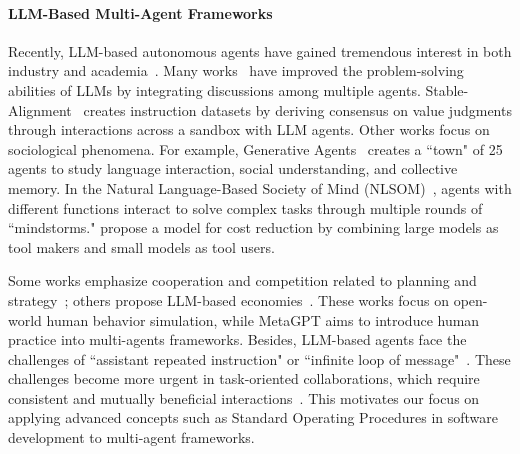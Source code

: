 \paragraph{LLM-Based Multi-Agent Frameworks} 
%
Recently, LLM-based autonomous agents have gained tremendous interest in both industry and academia~\citep{wang2023survey,zhou2023agents,zhang2023igniting}.
Many works~\citep{chen2024s,wang2023unleashing,du2023improving,zhuge2023mindstorms,hao2023chatllm,akata2023playing,tang2023medagents} have improved the problem-solving abilities of LLMs by integrating discussions among multiple agents.
%
Stable-Alignment~\citep{liu2023training} creates instruction datasets by deriving consensus on value judgments through interactions across a sandbox with LLM agents.
%
Other works focus on sociological phenomena. For example, Generative Agents~\citep{park2023generative} creates a ``town" of 25 agents to study language interaction, social understanding, and collective memory.
%
In the Natural Language-Based Society of Mind (NLSOM)~\citep{zhuge2023mindstorms}, agents with different functions interact to solve complex tasks through multiple rounds of ``mindstorms."
%
\citet{cai2023large} propose a model for cost reduction by combining large models as tool makers and small models as tool users.
%


%
Some works emphasize cooperation and competition related to planning and strategy~\citep{meta2022human}; others propose LLM-based economies~\citep{zhuge2023mindstorms}.
These works focus on open-world human behavior simulation, while MetaGPT aims to introduce human practice into multi-agents frameworks.
%
Besides, LLM-based agents face the challenges of ``assistant repeated instruction" or ``infinite loop of message"~\citep{talebirad2023multiagent,li2023camel}. These challenges become more urgent in task-oriented collaborations, which require consistent and mutually beneficial interactions~\citep{elazar2021measuring, wang2022self, jiang2023self}. 
This motivates our focus on applying advanced concepts such as Standard Operating Procedures in software development to multi-agent frameworks.

